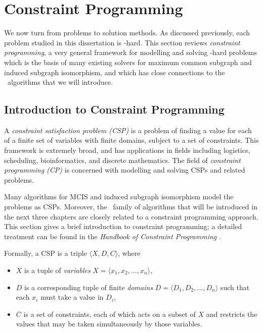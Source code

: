 
\section{Constraint Programming}\label{sec:cp}

We now turn from problems to solution methods.  As discussed previously, each
problem studied in this dissertation is \NP-hard.  This section reviews
\emph{constraint programming}, a very general framework for modelling and
solving \NP-hard problems which is the basis of many existing solvers for
maximum common subgraph and induced subgraph isomorphism, and which has close
connections to the \McSplit\ algorithms that we will introduce.

\subsection{Introduction to Constraint Programming}

A \emph{constraint satisfaction problem (CSP)} is a problem of finding a value
for each of a finite set of variables with finite domains, subject to a set of constraints.
This framework is extremely broad, and has applications in fields
including logistics, scheduling, bioinformatics, and discrete mathematics.
The field of \emph{constraint programming (CP)} is concerned with modelling
and solving CSPs and related problems.

Many algorithms
for MCIS and induced subgraph isomorphism model the problems as CSPs.
Moreover, the \McSplit\ family of algorithms that will be introduced in the next three chapters
are closely related to a constraint programming approach.
This section gives a brief introduction to constraint programming;
a detailed treatment can be found in the \emph{Handbook of Constraint
Programming} \citep{DBLP:reference/fai/2}.

Formally, a CSP is a triple $\langle X, D, C\rangle$, where

\begin{itemize}
\item $X$ is a tuple of \emph{variables} $X = \langle x_1, x_2, \dots, x_n \rangle$,
\item $D$ is a corresponding tuple of finite \emph{domains} $D = \langle D_1, D_2, \dots, D_n\rangle$
  such that each $x_i$ must take a value in $D_i$,
\item $C$ is a set of constraints, each of which acts on a subset of $X$ and restricts
  the values that may be taken simultaneously by those variables.
\end{itemize}

